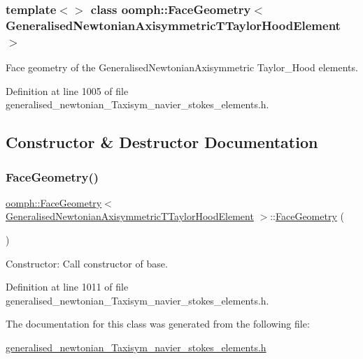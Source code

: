 \subsubsection*{template$<$$>$\newline
class oomph\+::\+Face\+Geometry$<$ Generalised\+Newtonian\+Axisymmetric\+T\+Taylor\+Hood\+Element $>$}

Face geometry of the Generalised\+Newtonian\+Axisymmetric Taylor\+\_\+\+Hood elements. 

Definition at line 1005 of file generalised\+\_\+newtonian\+\_\+\+Taxisym\+\_\+navier\+\_\+stokes\+\_\+elements.\+h.



\subsection{Constructor \& Destructor Documentation}
\mbox{\label{classoomph_1_1FaceGeometry_3_01GeneralisedNewtonianAxisymmetricTTaylorHoodElement_01_4_a7b0c15e37e5771b9860482aa7c90013b}} 
\subsubsection{\texorpdfstring{Face\+Geometry()}{FaceGeometry()}}
{\footnotesize\ttfamily \hyperlink{classoomph_1_1FaceGeometry}{oomph\+::\+Face\+Geometry}$<$ \hyperlink{classoomph_1_1GeneralisedNewtonianAxisymmetricTTaylorHoodElement}{Generalised\+Newtonian\+Axisymmetric\+T\+Taylor\+Hood\+Element} $>$\+::\hyperlink{classoomph_1_1FaceGeometry}{Face\+Geometry} (\begin{DoxyParamCaption}{ }\end{DoxyParamCaption})\hspace{0.3cm}{\ttfamily [inline]}}



Constructor\+: Call constructor of base. 



Definition at line 1011 of file generalised\+\_\+newtonian\+\_\+\+Taxisym\+\_\+navier\+\_\+stokes\+\_\+elements.\+h.



The documentation for this class was generated from the following file\+:\begin{DoxyCompactItemize}
\item 
\hyperlink{generalised__newtonian__Taxisym__navier__stokes__elements_8h}{generalised\+\_\+newtonian\+\_\+\+Taxisym\+\_\+navier\+\_\+stokes\+\_\+elements.\+h}\end{DoxyCompactItemize}
